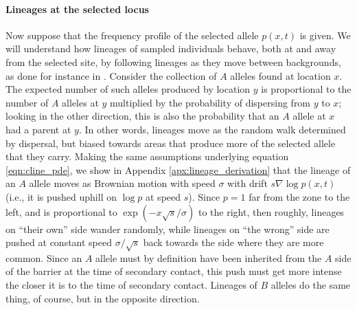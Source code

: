 \documentclass[12pt]{article}
\newcommand{\grad}{\nabla}
\begin{document}
\paragraph{Lineages at the selected locus}
Now suppose that the frequency profile of the selected allele $p(x,t)$ is given.
We will understand how lineages of sampled individuals behave,
both at and away from the selected site,
by following lineages as they move between backgrounds,
as done for instance in \citet{selectioncoal,ralph2015patchy}.
Consider the collection of $A$ alleles found at location $x$.
The expected number of such alleles produced by location $y$ is proportional to 
the number of $A$ alleles at $y$ multiplied by the probability of dispersing from $y$ to $x$;
looking in the other direction, this is also the probability that an $A$ allele at $x$ had a parent at $y$.
In other words, lineages move as the random walk determined by dispersal,
but biased towards areas that produce more of the selected allele that they carry.
Making the same assumptions underlying equation \eqref{eqn:cline_pde},
we show in Appendix \ref{apx:lineage_derivation}
that the lineage of an $A$ allele moves as Brownian motion with speed $\sigma$
with drift $s \grad \log p(x,t)$ (i.e., it is pushed uphill on $\log p$ at speed $s$).
Since $p=1$ far from the zone to the left, 
and is proportional to $\exp(-x\sqrt{s}/\sigma)$ to the right,
then roughly, lineages on ``their own'' side wander randomly,
while lineages on ``the wrong'' side are pushed at constant speed $\sigma/\sqrt{s}$ 
back towards the side where they are more common.
Since an $A$ allele must by definition have been inherited from the $A$ side of the barrier 
at the time of secondary contact,
this push must get more intense the closer it is to the time of secondary contact.
Lineages of $B$ alleles do the same thing, of course, but in the opposite direction.
\end{document}
